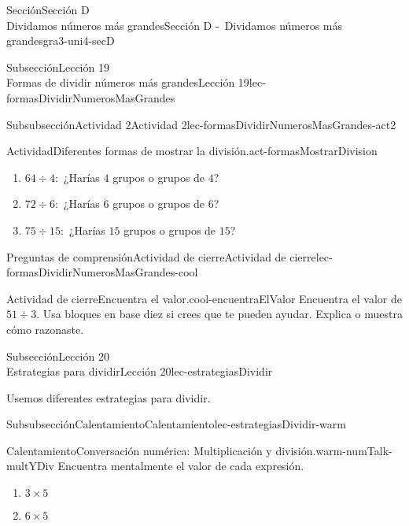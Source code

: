 \begin{sectionptx}{Sección}{{\Large Sección D\\}Dividamos números más grandes}{}{Sección D -~Dividamos números más grandes}{}{}{gra3-uni4-secD}
\begin{subsectionptx}{Subsección}{{\normalsize Lección 19\\[-0.05cm]}Formas de dividir números más grandes}{}{Lección 19}{}{}{lec-formasDividirNumerosMasGrandes}
\begin{subsubsectionptx}{Subsubsección}{Actividad 2}{}{Actividad 2}{}{}{lec-formasDividirNumerosMasGrandes-act2}
\begin{activity}{Actividad}{Diferentes formas de mostrar la división.}{act-formasMostrarDivision}
\begin{enumerate}
\begin{enumerate}
\item{}\(64 \div 4:\) ¿Harías \(4\) grupos o grupos de \(4\)?%
\item{}\(72 \div 6:\) ¿Harías \(6\) grupos o grupos de \(6\)?%
\item{}\(75 \div 15:\) ¿Harías \(15\) grupos o grupos de \(15\)?%
\end{enumerate}
\end{enumerate}
\end{activity}%
\end{subsubsectionptx}
%
%
\typeout{************************************************}
\typeout{************************************************}
%
\begin{reading-questions-subsubsection}{Preguntas de comprensión}{Actividad de cierre}{}{Actividad de cierre}{}{}{lec-formasDividirNumerosMasGrandes-cool}
\begin{project}{Actividad de cierre}{Encuentra el valor.}{cool-encuentraElValor}%
Encuentra el valor de \(51 \div 3.\) Usa bloques en base diez si crees que te pueden ayudar. Explica o muestra cómo razonaste.%
\end{project}%
\end{reading-questions-subsubsection}
\end{subsectionptx}
%
%
\typeout{************************************************}
\typeout{************************************************}
%
\begin{subsectionptx}{Subsección}{{\normalsize Lección 20\\[-0.05cm]}Estrategias para dividir}{}{Lección 20}{}{}{lec-estrategiasDividir}
\begin{introduction}{}%
Usemos diferentes estrategias para dividir.%
\end{introduction}%
%
%
\typeout{************************************************}
\typeout{************************************************}
%
\begin{subsubsectionptx}{Subsubsección}{Calentamiento}{}{Calentamiento}{}{}{lec-estrategiasDividir-warm}
\begin{exploration}{Calentamiento}{Conversación numérica: Multiplicación y división.}{warm-numTalk-multYDiv}%
Encuentra mentalmente el valor de cada expresión.%
%
\begin{enumerate}[label={\Alph*.}]
\item{}\(\displaystyle 3\times 5\)%
\item{}\(\displaystyle 6\times 5\)%

\end{enumerate}
\end{exploration}
\end{subsubsectionptx}
\end{subsectionptx}
\end{sectionptx}
